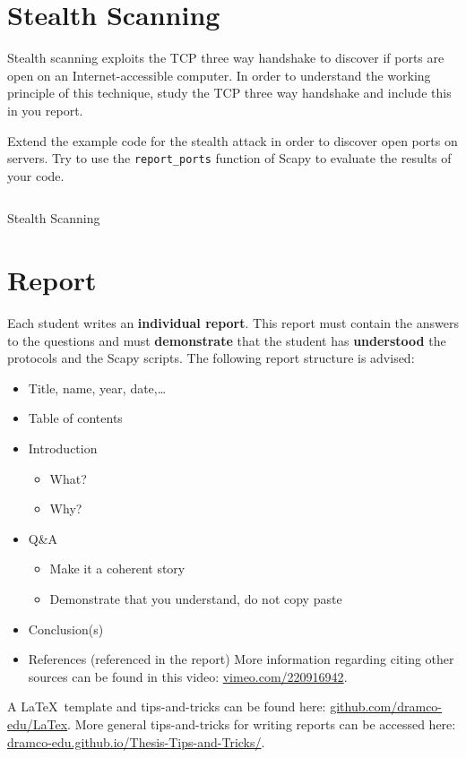 \documentclass[11pt,a4paper]{article}
\begin{document}
\FloatBarrier
\section{Stealth Scanning}
Stealth scanning exploits the TCP three way handshake to discover if ports are open on an Internet-accessible computer. In order to understand the working principle of this technique, study the TCP three way handshake and include this in you report.

\begin{question}
Extend the example code for the stealth attack in order to discover open ports on servers.
Try to use the \texttt{report\_ports} function of Scapy to evaluate the results of your code.
\end{question}


\begin{listing}[h]
\inputminted{python}{../code_students/stealth_scanning.py}
\caption{Stealth Scanning}%
\label{listing:stealth-scanning}
\end{listing}


\FloatBarrier
\section{Report}
Each student writes an \textbf{individual report}. 
This report must contain the answers to the questions and must \textbf{demonstrate} that the student has \textbf{understood} the protocols and the Scapy scripts. The following report structure is advised:
\begin{itemize}
    \item Title, name, year, date,\ldots
    \item Table of contents
    \item Introduction
        \begin{itemize}
            \item What?
            \item Why?
        \end{itemize}
    \item Q\&A
    \begin{itemize}
        \item Make it a coherent story
        \item Demonstrate that you understand, do not copy paste
    \end{itemize}
    \item Conclusion(s)
    \item References (referenced in the report)
    More information regarding citing other sources can be found in this video: \url{vimeo.com/220916942}.
\end{itemize}
A \LaTeX\ template and tips-and-tricks can be found here: \url{github.com/dramco-edu/LaTex}. More general tips-and-tricks for writing reports can be accessed here: \url{dramco-edu.github.io/Thesis-Tips-and-Tricks/}. 
\end{document}
